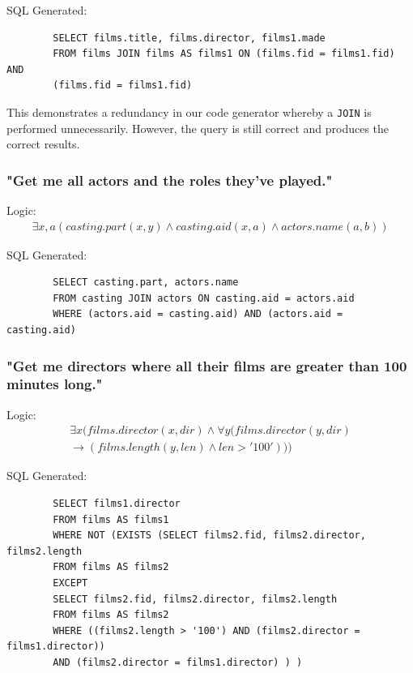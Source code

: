 \documentclass[a4paper, 11pt]{article}
\begin{document}
      SQL Generated:
      \begin{verbatim}
        SELECT films.title, films.director, films1.made
        FROM films JOIN films AS films1 ON (films.fid = films1.fid) AND
        (films.fid = films1.fid)
      \end{verbatim}

      This demonstrates a redundancy in our code generator whereby a
      \texttt{JOIN} is performed unnecessarily. However, the query is still
      correct and produces the correct results.

    \subsubsection*{"Get me all actors and the roles they've played."}

      Logic:
      \begin{gather}
        \exists x,a(casting.part(x, y) \land casting.aid(x, a) \land actors.name(a, b))
      \end{gather}

      SQL Generated:
      \begin{verbatim}
        SELECT casting.part, actors.name
        FROM casting JOIN actors ON casting.aid = actors.aid
        WHERE (actors.aid = casting.aid) AND (actors.aid = casting.aid)
      \end{verbatim}

    \subsubsection*{"Get me directors where all their films are greater than 100
      minutes long."}

      Logic:
      \begin{multline}
        \exists x(films.director(x, dir) \land \forall y(films.director(y, dir)
        \\
        \to (films.length(y, len) \land len > '100')))
      \end{multline}

      SQL Generated:
      \begin{verbatim}
        SELECT films1.director
        FROM films AS films1
        WHERE NOT (EXISTS (SELECT films2.fid, films2.director, films2.length
        FROM films AS films2
        EXCEPT
        SELECT films2.fid, films2.director, films2.length
        FROM films AS films2
        WHERE ((films2.length > '100') AND (films2.director = films1.director))
        AND (films2.director = films1.director) ) )
      \end{verbatim}
\end{document}
